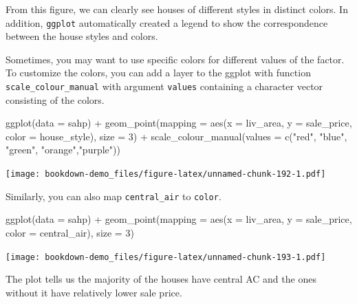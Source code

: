 \documentclass[
]{book}
\newenvironment{Shaded}{\begin{snugshade}}{\end{snugshade}}
\newcommand{\AttributeTok}[1]{\textcolor[rgb]{0.77,0.63,0.00}{#1}}
\newcommand{\DecValTok}[1]{\textcolor[rgb]{0.00,0.00,0.81}{#1}}
\newcommand{\FunctionTok}[1]{\textcolor[rgb]{0.00,0.00,0.00}{#1}}
\newcommand{\NormalTok}[1]{#1}
\newcommand{\SpecialCharTok}[1]{\textcolor[rgb]{0.00,0.00,0.00}{#1}}
\newcommand{\StringTok}[1]{\textcolor[rgb]{0.31,0.60,0.02}{#1}}
\begin{document}
From this figure, we can clearly see houses of different styles in distinct colors. In addition, \texttt{ggplot} automatically created a legend to show the correspondence between the house styles and colors.

Sometimes, you may want to use specific colors for different values of the factor. To customize the colors, you can add a layer to the ggplot with function \texttt{scale\_colour\_manual} with argument \texttt{values} containing a character vector consisting of the colors.

\begin{Shaded}
\begin{Highlighting}[]
\FunctionTok{ggplot}\NormalTok{(}\AttributeTok{data =}\NormalTok{ sahp) }\SpecialCharTok{+} \FunctionTok{geom\_point}\NormalTok{(}\AttributeTok{mapping =} \FunctionTok{aes}\NormalTok{(}\AttributeTok{x =}\NormalTok{ liv\_area, }\AttributeTok{y =}\NormalTok{ sale\_price, }\AttributeTok{color =}\NormalTok{ house\_style), }\AttributeTok{size =} \DecValTok{3}\NormalTok{) }\SpecialCharTok{+}  \FunctionTok{scale\_colour\_manual}\NormalTok{(}\AttributeTok{values =} \FunctionTok{c}\NormalTok{(}\StringTok{"red"}\NormalTok{, }\StringTok{"blue"}\NormalTok{, }\StringTok{"green"}\NormalTok{, }\StringTok{"orange"}\NormalTok{,}\StringTok{"purple"}\NormalTok{))}
\end{Highlighting}
\end{Shaded}

\texttt{[image: bookdown-demo\_files/figure-latex/unnamed-chunk-192-1.pdf]}

Similarly, you can also map \texttt{central\_air} to \texttt{color}.

\begin{Shaded}
\begin{Highlighting}[]
\FunctionTok{ggplot}\NormalTok{(}\AttributeTok{data =}\NormalTok{ sahp) }\SpecialCharTok{+} \FunctionTok{geom\_point}\NormalTok{(}\AttributeTok{mapping =} \FunctionTok{aes}\NormalTok{(}\AttributeTok{x =}\NormalTok{ liv\_area, }\AttributeTok{y =}\NormalTok{ sale\_price, }\AttributeTok{color =}\NormalTok{ central\_air), }\AttributeTok{size =} \DecValTok{3}\NormalTok{)}
\end{Highlighting}
\end{Shaded}

\texttt{[image: bookdown-demo\_files/figure-latex/unnamed-chunk-193-1.pdf]}

The plot tells us the majority of the houses have central AC and the ones without it have relatively lower sale price.
\end{document}
